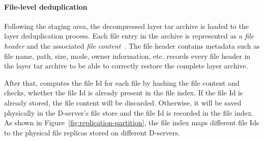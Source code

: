 %

%
\paragraph{File-level deduplication}
%
Following the staging area, 
the decompressed layer tar archive is loaded to the layer deduplication process.
Each file entry in the archive is represented as a \emph{file header} and the associated
\emph{file content}~\cite{basictar}\todo{ }.
The file header contains metadata such as file name, path, size, mode, owner information, etc\todo{ }.
%
%
\sysname records every file header in the layer tar archive
to be able to correctly restore the complete layer archive.
%

After that, \sysname computes the file Id for each file by hashing the file content and 
checks, whether the file Id is already present in the file index.
If the file Id is already stored, the file content will be discarded. 
Otherwise, it will be saved physically in the D-server's file store and 
the file Id is recorded in the file index. As shown in Figure~\ref{fig:replication-partition},
the file index maps different file Ids to the physical file replicas stored
on different D-servers.


